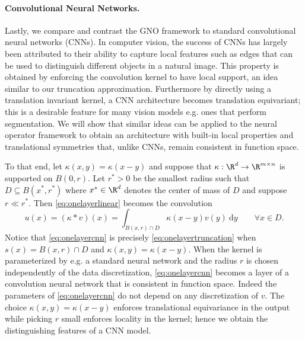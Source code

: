 \paragraph{Convolutional Neural Networks. } Lastly, we compare and contrast the GNO framework to standard convolutional neural networks (CNNs). 
In computer vision, the success of CNNs has largely been attributed to their ability to capture local features such as edges that can be used to distinguish different objects in a natural image. This property is obtained by enforcing the convolution kernel to have local support, an idea similar to our truncation approximation. Furthermore by directly using a translation invariant kernel, a CNN architecture becomes translation equivariant; this is a desirable feature for many vision models e.g. ones that perform segmentation. We will show that similar ideas can be applied to the neural operator framework to obtain an architecture with built-in local properties and translational symmetries that, unlike CNNs, remain consistent in function space.

To that end, let \(\kappa(x,y) = \kappa(x - y)\) and suppose that \(\kappa : \R^d \to \R^{m \times n}\) is supported on \(B(0,r)\). Let \(r^* > 0\) be the smallest radius such that \(D \subseteq B(x^*, r^*)\) where \(x^* \in \R^d\) denotes the center of mass of \(D\) and suppose \(r \ll r^*\). Then \eqref{eq:onelayerlinear} becomes the convolution
\begin{equation}
    \label{eq:onelayercnn}
    u(x) = (\kappa * v)(x) = \int_{B(x,r) \cap D} \kappa(x-y) v(y) \: \text{d} y \qquad \forall x \in D.
\end{equation}
Notice that \eqref{eq:onelayercnn} is precisely \eqref{eq:onelayertruncation} when \(s(x) = B(x,r) \cap D\) and \(\kappa(x,y) = \kappa(x - y)\). When the kernel is parameterized by e.g. a standard neural network and the radius \(r\) is chosen independently of the data discretization, \eqref{eq:onelayercnn} becomes a layer of a convolution neural network that is consistent in function space. Indeed the parameters of \eqref{eq:onelayercnn} do not depend on any discretization of \(v\). The choice \(\kappa(x,y) = \kappa(x - y)\) enforces translational equivariance in the output while picking \(r\) small enforces locality in the kernel; 
hence we obtain the distinguishing features of a CNN model.

